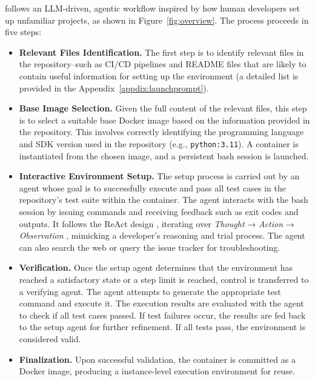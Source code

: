 \method{} follows an LLM-driven, agentic workflow \cite{zhang2024large, zhang2025api} inspired by how human developers set up unfamiliar projects, as shown in Figure~\ref{fig:overview}. The process proceeds in five steps:
\begin{itemize}[leftmargin=*]
    \item \textbf{Relevant Files Identification.} The first step is to identify relevant files in the repository--such as CI/CD pipelines and README files that are likely to contain useful information for setting up the environment (a detailed list is provided in the Appendix~\ref{appdix:launchprompt}).
    
    \item \textbf{Base Image Selection.} Given the full content of the relevant files, this step is to select a suitable base Docker image based on the information provided in the repository. This involves correctly identifying the programming language and SDK version used in the repository (e.g., \texttt{python:3.11}). A container is instantiated from the chosen image, and a persistent bash session is launched.
    
    \item \textbf{Interactive Environment Setup.} The setup process is carried out by an agent whose goal is to successfully execute and pass all test cases in the repository’s test suite within the container. The agent interacts with the bash session by issuing commands and receiving feedback such as exit codes and outputs. It follows the ReAct design \cite{yao2023react}, iterating over \textit{Thought} → \textit{Action} → \textit{Observation} \cite{zhang2024ufo, zhang2025ufo2}, mimicking a developer's reasoning and trial process. The agent can also search the web or query the issue tracker for troubleshooting.
    
    \item \textbf{Verification.} Once the setup agent determines that the environment has reached a satisfactory state or a step limit is reached, control is transferred to a verifying agent. The agent attempts to generate the appropriate test command and execute it. The execution results are evaluated with the agent to check if all test cases passed. If test failures occur, the results are fed back to the setup agent for further refinement. If all tests pass, the environment is considered valid.
    
    \item \textbf{Finalization.} Upon successful validation, the container is committed as a Docker image, producing a instance-level execution environment for reuse.
\end{itemize}

